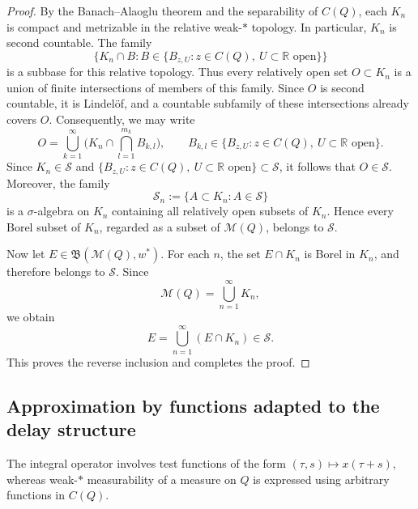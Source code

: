\documentclass[reqno]{amsart}
\theoremstyle{plain}
\numberwithin{equation}{section}
\numberwithin{definition}{section}
\begin{document}
{\begin{proof}
By the Banach--Alaoglu theorem and the separability of $C(Q)$,
each $K_n$ is compact and metrizable in the relative weak-$*$
topology. In particular, $K_n$ is second countable. The family
\begin{equation*}
\{K_n\cap B:B\in \{B_{z,U}:
        z\in C(Q),\
        U\subset\mathbb R\text{ open}\}\}
\end{equation*}
is a subbase for this relative topology. Thus every relatively
open set $O\subset K_n$ is a union of finite intersections
of members of this family. Since $O$ is second countable,
it is Lindel\"of, and a countable subfamily of these intersections
already covers $O$. Consequently, we may write
\begin{equation*}
O=
\bigcup_{k=1}^{\infty}
\Big(
K_n\cap\bigcap_{l=1}^{m_k}B_{k,l}
\Big),
\qquad B_{k,l}\in \{B_{z,U}:
        z\in C(Q),\
        U\subset\mathbb R\text{ open}\}.
\end{equation*}
Since $K_n\in\mathcal{S}$ and
$\{B_{z,U}:
        z\in C(Q),\
        U\subset\mathbb R\text{ open}\}\subset\mathcal{S}$, it follows that
$O\in\mathcal{S}$. Moreover, the family
\begin{equation*}
\mathcal{S}_n
:=
\{A\subset K_n:A\in\mathcal{S}\}
\end{equation*}
is a $\sigma$-algebra on $K_n$ containing all relatively open
subsets of $K_n$. Hence every Borel subset of $K_n$,
regarded as a subset of $\mathcal{M}(Q)$, belongs to
$\mathcal{S}$.

Now let $E\in\mathfrak{B}(\mathcal{M}(Q),w^*)$.
For each $n$, the set $E\cap K_n$ is Borel in $K_n$,
and therefore belongs to $\mathcal{S}$. Since
\begin{equation*}
    \mathcal{M}(Q)=\bigcup_{n=1}^{\infty}K_n, 
\end{equation*}
we obtain
\begin{equation*}
E=\bigcup_{n=1}^{\infty}(E\cap K_n)\in\mathcal{S}.
\end{equation*}
This proves the reverse inclusion and completes the proof.
\end{proof}

\subsection{Approximation by functions adapted to the delay structure}
The integral operator involves test functions of the form
$(\tau,s)\mapsto x(\tau+s)$, whereas weak-$*$ measurability
of a measure on $Q$ is expressed using arbitrary functions
in $C(Q)$.

}
\end{document}
